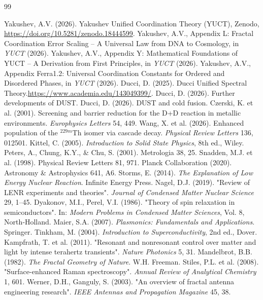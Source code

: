 \documentclass[12pt]{article}
\theoremstyle{remark}
\begin{document}
	\begin{thebibliography}{99}
		
		 Yakushev, A.V. (2026). Yakushev Unified Coordination Theory (YUCT), Zenodo, \url{https://doi.org/10.5281/zenodo.18444599}.
		 Yakushev, A.V., Appendix L: Fractal Coordination Error Scaling – A Universal Law from DNA to Cosmology, in \emph{YUCT} (2026).
		 Yakushev, A.V., Appendix Y: Mathematical Foundations of YUCT – A Derivation from First Principles, in \emph{YUCT} (2026).
		 Yakushev, A.V., Appendix Ferra1.2: Universal Coordination Constants for Ordered and Disordered Phases, in \emph{YUCT} (2026).
		 Ducci, D. (2025). Ducci Unified Spectral Theory.\url{https://www.academia.edu/143049399/}.
		 Ducci, D. (2026). Further developments of DUST.
		 Ducci, D. (2026). DUST and cold fusion.
		 Czerski, K. et al. (2001). Screening and barrier reduction for the D+D reaction in metallic environments. \textit{Europhysics Letters} 54, 449.
		 Wang, X. et al. (2026). Enhanced population of the \(^{229m}\)Th isomer via cascade decay. \textit{Physical Review Letters} 136, 012501.
		 Kittel, C. (2005). \textit{Introduction to Solid State Physics}, 8th ed., Wiley.
		 Peters, A., Chung, K.Y., \& Chu, S. (2001). Metrologia 38, 25.
		 Snadden, M.J. et al. (1998). Physical Review Letters 81, 971.
		 Planck Collaboration (2020). Astronomy \& Astrophysics 641, A6.
		 Storms, E. (2014). \textit{The Explanation of Low Energy Nuclear Reaction}. Infinite Energy Press.
		 Nagel, D.J. (2019). "Review of LENR experiments and theories". \textit{Journal of Condensed Matter Nuclear Science} 29, 1–45.
		 Dyakonov, M.I., Perel, V.I. (1986). "Theory of spin relaxation in semiconductors". In: \textit{Modern Problems in Condensed Matter Sciences}, Vol. 8, North‑Holland.
		 Maier, S.A. (2007). \textit{Plasmonics: Fundamentals and Applications}. Springer.
		 Tinkham, M. (2004). \textit{Introduction to Superconductivity}, 2nd ed., Dover.
		 Kampfrath, T. et al. (2011). "Resonant and nonresonant control over matter and light by intense terahertz transients". \textit{Nature Photonics} 5, 31.
		 Mandelbrot, B.B. (1982). \textit{The Fractal Geometry of Nature}. W.H. Freeman.
		 Stiles, P.L. et al. (2008). "Surface-enhanced Raman spectroscopy". \textit{Annual Review of Analytical Chemistry} 1, 601.
		 Werner, D.H., Ganguly, S. (2003). "An overview of fractal antenna engineering research". \textit{IEEE Antennas and Propagation Magazine} 45, 38.
	\end{thebibliography}
	
\end{document}
